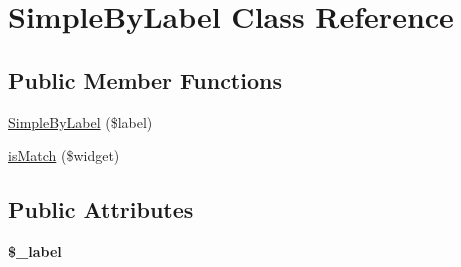 \hypertarget{class_simple_by_label}{
\section{SimpleByLabel Class Reference}
\label{class_simple_by_label}
}
\subsection*{Public Member Functions}
\begin{DoxyCompactItemize}
\item 
\hyperlink{class_simple_by_label_aaefd319810b89b2bc21a6831875cb547}{SimpleByLabel} (\$label)
\item 
\hyperlink{class_simple_by_label_ad8a7657dd1c94a5e642e01810308bce4}{isMatch} (\$widget)
\end{DoxyCompactItemize}
\subsection*{Public Attributes}
\begin{DoxyCompactItemize}
\item 
\hypertarget{class_simple_by_label_a6693a84bf7d09144610a22b65204dc41}{
{\bfseries \$\_\-label}}
\label{class_simple_by_label_a6693a84bf7d09144610a22b65204dc41}

\end{DoxyCompactItemize}


